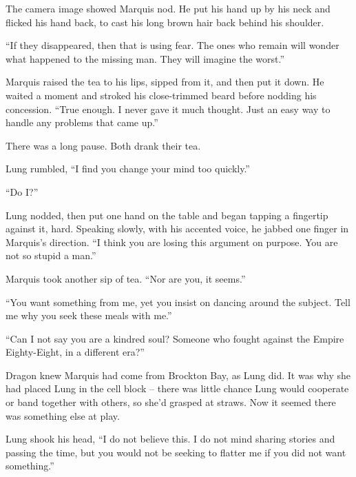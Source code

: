 The camera image showed Marquis nod.  He put his hand up by his neck and flicked his hand back, to cast his long brown hair back behind his shoulder.



``If they disappeared, then that is using fear.  The ones who remain will wonder what happened to the missing man.  They will imagine the worst.''



Marquis raised the tea to his lips, sipped from it, and then put it down.  He waited a moment and stroked his close-trimmed beard before nodding his concession.  ``True enough.  I never gave it much thought.  Just an easy way to handle any problems that came up.''



There was a long pause.  Both drank their tea.



Lung rumbled, ``I find you change your mind too quickly.''



``Do I?''



Lung nodded, then put one hand on the table and began tapping a fingertip against it, hard.  Speaking slowly, with his accented voice, he jabbed one finger in Marquis's direction.  ``I think you are losing this argument on purpose.  You are not so stupid a man.''



Marquis took another sip of tea.  ``Nor are you, it seems.''



``You want something from me, yet you insist on dancing around the subject.  Tell me why you seek these meals with me.''



``Can I not say you are a kindred soul?  Someone who fought against the Empire Eighty-Eight, in a different era?''



Dragon knew Marquis had come from Brockton Bay, as Lung did.  It was why she had placed Lung in the cell block – there was little chance Lung would cooperate or band together with others, so she'd grasped at straws.  Now it seemed there was something else at play.



Lung shook his head, ``I do not believe this.  I do not mind sharing stories and passing the time, but you would not be seeking to flatter me if you did not want something.''



